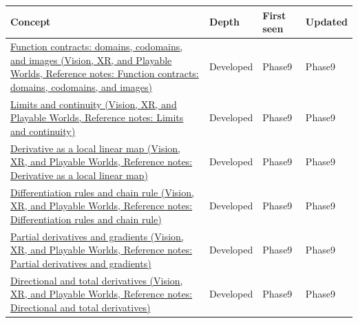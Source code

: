 {\def\LTcaptype{none} %
\begin{longtable}[]{@{}
  >{\raggedright\arraybackslash}p{}
  >{\raggedright\arraybackslash}p{}
  >{\raggedright\arraybackslash}p{}
  >{\raggedright\arraybackslash}p{}@{}}
\toprule\noalign{}
\begin{minipage}[b]{\linewidth}\raggedright
Concept
\end{minipage} & \begin{minipage}[b]{\linewidth}\raggedright
Depth
\end{minipage} & \begin{minipage}[b]{\linewidth}\raggedright
First seen
\end{minipage} & \begin{minipage}[b]{\linewidth}\raggedright
Updated
\end{minipage} \\
\midrule\noalign{}
\endhead
\bottomrule\noalign{}
\endlastfoot
\href{../07-Vision-XR-and-Playable-Worlds/main.pdf\#nameddest=appendix-a59658325cd6}{Function contracts: domains, codomains, and images (Vision, XR, and Playable Worlds, Reference notes: Function contracts: domains, codomains, and images)} & Developed & Phase9 & Phase9 \\
\href{../07-Vision-XR-and-Playable-Worlds/main.pdf\#nameddest=appendix-fecc1847f5a3}{Limits and continuity (Vision, XR, and Playable Worlds, Reference notes: Limits and continuity)} & Developed & Phase9 & Phase9 \\
\href{../07-Vision-XR-and-Playable-Worlds/main.pdf\#nameddest=appendix-7bc181935c42}{Derivative as a local linear map (Vision, XR, and Playable Worlds, Reference notes: Derivative as a local linear map)} & Developed & Phase9 & Phase9 \\
\href{../07-Vision-XR-and-Playable-Worlds/main.pdf\#nameddest=appendix-d9f70bdfbc92}{Differentiation rules and chain rule (Vision, XR, and Playable Worlds, Reference notes: Differentiation rules and chain rule)} & Developed & Phase9 & Phase9 \\
\href{../07-Vision-XR-and-Playable-Worlds/main.pdf\#nameddest=appendix-677b59746ae0}{Partial derivatives and gradients (Vision, XR, and Playable Worlds, Reference notes: Partial derivatives and gradients)} & Developed & Phase9 & Phase9 \\
\href{../07-Vision-XR-and-Playable-Worlds/main.pdf\#nameddest=appendix-e2d476574aab}{Directional and total derivatives (Vision, XR, and Playable Worlds, Reference notes: Directional and total derivatives)} & Developed & Phase9 & Phase9 \\

\end{longtable}}
